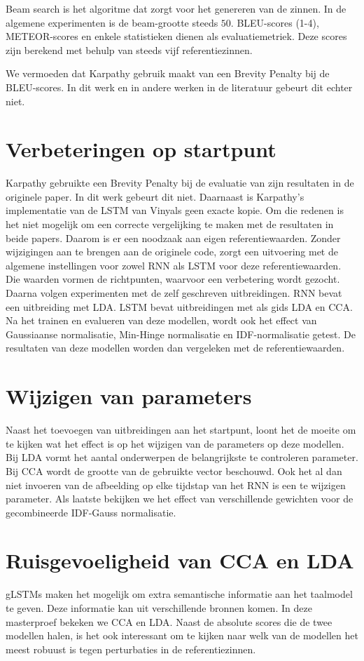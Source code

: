 Beam search is het algoritme dat zorgt voor het genereren van de zinnen. In de algemene experimenten is de beam-grootte steeds $50$.
BLEU-scores (1-4), METEOR-scores en enkele statistieken dienen als evaluatiemetriek. Deze scores zijn berekend met behulp van steeds vijf referentiezinnen.

We vermoeden dat Karpathy gebruik maakt van een Brevity Penalty bij de BLEU-scores. In dit werk en in andere werken in de literatuur gebeurt dit echter niet.

\section{Verbeteringen op startpunt}
Karpathy gebruikte een Brevity Penalty bij de evaluatie van zijn resultaten in de originele paper. In dit werk gebeurt dit niet. Daarnaast is Karpathy's implementatie van de LSTM van Vinyals geen exacte kopie. Om die redenen is het niet mogelijk om een correcte vergelijking te maken met de resultaten in beide papers. Daarom is er een noodzaak aan eigen referentiewaarden. Zonder wijzigingen aan te brengen aan de originele code, zorgt een uitvoering met de algemene instellingen voor zowel RNN als LSTM voor deze referentiewaarden. Die waarden vormen de richtpunten, waarvoor een verbetering wordt gezocht.
Daarna volgen experimenten met de zelf geschreven uitbreidingen. RNN bevat een uitbreiding met LDA. LSTM bevat uitbreidingen met als gids LDA en CCA.
Na het trainen en evalueren van deze modellen, wordt ook het effect van Gaussiaanse normalisatie, Min-Hinge normalisatie en IDF-normalisatie getest.
De resultaten van deze modellen worden dan vergeleken met de referentiewaarden.

\section{Wijzigen van parameters}
Naast het toevoegen van uitbreidingen aan het startpunt, loont het de moeite om te kijken wat het effect is op het wijzigen van de parameters op deze modellen. Bij LDA vormt het aantal onderwerpen de belangrijkste te controleren parameter. Bij CCA wordt de grootte van de gebruikte vector beschouwd. Ook het al dan niet invoeren van de afbeelding op elke tijdstap van het RNN is een te wijzigen parameter. Als laatste bekijken we het effect van verschillende gewichten voor de gecombineerde IDF-Gauss normalisatie.

\section{Ruisgevoeligheid van CCA en LDA} %
\label{sec:ruisgevoeligheid_van_cca_en_lda_exp}
gLSTMs maken het mogelijk om extra semantische informatie aan het taalmodel te geven. Deze informatie kan uit verschillende bronnen komen. In deze masterproef bekeken we CCA en LDA. Naast de absolute scores die de twee modellen halen, is het ook interessant om te kijken naar welk van de modellen het meest robuust is tegen perturbaties in de referentiezinnen.

